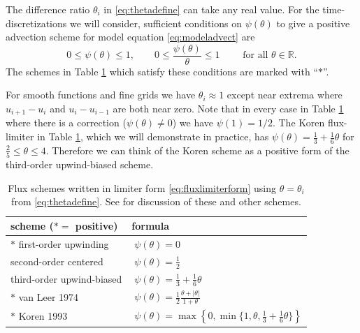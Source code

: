 \documentclass[11pt,final]{amsart}%
\newcommand\RR{\mathbb{R}}
\begin{document}
The difference ratio $\theta_i$ in \eqref{eq:thetadefine} can take any real value.  For the time-discretizations we will consider, sufficient conditions on $\psi(\theta)$ to give a positive advection scheme for model equation \eqref{eq:modeladvect} are
\begin{equation}
0 \le \psi(\theta) \le 1, \qquad 0 \le \frac{\psi(\theta)}{\theta} \le 1 \qquad \text{ for all } \theta \in \RR.
\end{equation}
The schemes in Table \ref{tab:fluxlimiters} which satisfy these conditions are marked with ``$\ast$''.

For smooth functions and fine grids we have $\theta_i\approx 1$ except near extrema where $u_{i+1} - u_i$ and $u_i - u_{i-1}$ are both near zero.  Note that in every case in Table \ref{tab:fluxlimiters} where there is a correction ($\psi(\theta)\ne 0$) we have $\psi(1)=1/2$.  The Koren flux-limiter in Table \ref{tab:fluxlimiters}, which we will demonstrate in practice, has $\psi(\theta) = \frac{1}{3}+\frac{1}{6} \theta$ for $\frac{2}{5} \le \theta \le 4$.  Therefore we can think of the Koren scheme as a positive form of the third-order upwind-biased scheme.

\begin{table}[ht]
  \centering
  \caption{Flux schemes written in limiter form \eqref{eq:fluxlimiterform} using $\theta=\theta_i$ from \eqref{eq:thetadefine}.  See \cite{HundsdorferVerwer2010} for discussion of these and other schemes.}
  \begin{tabular}{ll}
    \textbf{scheme ($\ast=$ positive)} & \textbf{formula} \\
\hline
    $\ast$ first-order upwinding               & $\phantom{\Big|}\psi(\theta) = 0$ \\
    \phantom{$\ast$} second-order centered     & $\phantom{\Big|}\psi(\theta) = \frac{1}{2}$  \\
    \phantom{$\ast$} third-order upwind-biased & $\phantom{\Big|}\psi(\theta) = \frac{1}{3}+\frac{1}{6} \theta$  \\
    $\ast$ van Leer 1974                       & $\phantom{\Big|}\psi(\theta) = \frac{1}{2} \frac{\theta + |\theta|}{1+\theta}$  \\
    $\ast$ Koren 1993                          & $\phantom{\Big|}\psi(\theta) = \max\left\{0,\min\{1,\theta,\frac{1}{3}+\frac{1}{6} \theta\}\right\}$  \\
    \hline
  \end{tabular}
 \label{tab:fluxlimiters}
\end{table}
\end{document}
